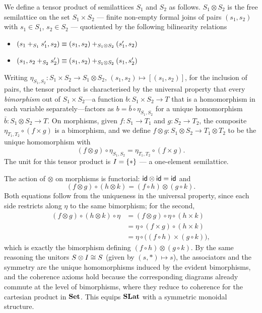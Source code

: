 \begin{definition}\label{def:slat-tensor}
We define a tensor product of semilattices $S_1$ and $S_2$ as follows.
$S_1 \otimes S_2$ is the free semilattice on the set $S_1 \times S_2$ --- finite non-empty formal joins of pairs $(s_1,s_2)$ with $s_{1} \in S_{1}$, $s_2 \in S_{2}$ --- quotiented by the following bilinearity relations
\begin{itemize}
    \item $(s_1 +_{S_{1}} s_1', s_2) \equiv (s_1,s_2) +_{S_{1} \otimes S_{2}} (s'_1, s_2)$
    \item $(s_1, s_2 +_{S_{2}} s'_2) \equiv (s_1, s_2) +_{S_{1} \otimes S_{2}} (s_1,s'_2)$
\end{itemize}
Writing $\eta_{S_1,S_2} : S_1 \times S_2 \to S_1 \otimes S_2$, $(s_1,s_2) \mapsto [(s_1,s_2)]$, for the inclusion of pairs, the tensor product is characterised by the universal property that every \emph{bimorphism} out of $S_1 \times S_2$---a function $b : S_1 \times S_2 \to T$ that is a homomorphism in each variable separately---factors as $b = \bar{b} \circ \eta_{S_1,S_2}$ for a unique homomorphism $\bar{b} : S_1 \otimes S_2 \to T$.
On morphisms, given $f : S_1 \to T_1$ and $g : S_2 \to T_2$, the composite $\eta_{T_1,T_2} \circ (f \times g)$ is a bimorphism, and we define $f \otimes g : S_1 \otimes S_2 \to T_1 \otimes T_2$ to be the unique homomorphism with
\[
(f \otimes g) \circ \eta_{S_1,S_2} = \eta_{T_1,T_2} \circ (f \times g).
\]
The unit for this tensor product is $I = \{*\}$ --- a one-element semilattice.
\end{definition}

\begin{remark}\label{rem:slat-tensor-functorial}
The action of $\otimes$ on morphisms is functorial: $\textsf{id} \otimes \textsf{id} = \textsf{id}$ and
\[
(f \otimes g) \circ (h \otimes k) = (f \circ h) \otimes (g \circ k).
\]
Both equations follow from the uniqueness in the universal property, since each side restricts along $\eta$ to the same bimorphism; for the second,
\[
\begin{aligned}
(f \otimes g) \circ (h \otimes k) \circ \eta
&= (f \otimes g) \circ \eta \circ (h \times k) \\
&= \eta \circ (f \times g) \circ (h \times k) \\
&= \eta \circ \big((f \circ h) \times (g \circ k)\big),
\end{aligned}
\]
which is exactly the bimorphism defining $(f \circ h) \otimes (g \circ k)$. By the same reasoning the unitors $S \otimes I \cong S$ (given by $(s,*) \mapsto s$), the associators and the symmetry are the unique homomorphisms induced by the evident bimorphisms, and the coherence axioms hold because the corresponding diagrams already commute at the level of bimorphisms, where they reduce to coherence for the cartesian product in $\mathbf{Set}$. This equips $\mathbf{SLat}$ with a symmetric monoidal structure.
\end{remark}

